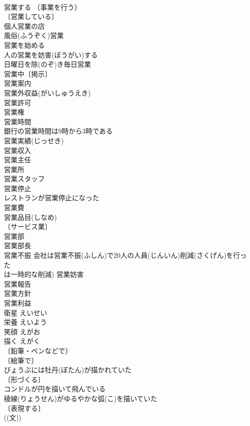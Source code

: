 \documentclass[8pt]{extreport}
\begin{document}
\begin{CJK}{UTF8}{min}
\\	営業する 〔事業を行う〕
\\	〔営業している〕
\\	個人営業の店 
\\	風俗(ふうぞく)営業 
\\	営業を始める 
\\	人の営業を妨害(ぼうがい)する 
\\	日曜日を除(のぞ)き毎日営業 
\\	営業中〔掲示〕 
\\	営業案内 
\\	営業外収益(がいしゅうえき) 
\\	営業許可 
\\	営業権 
\\	営業時間 
\\	銀行の営業時間は9時から3時である 
\\	営業実績(じっせき) 
\\	営業収入 
\\	営業主任 
\\	営業所 
\\	営業スタッフ 
\\	営業停止 
\\	レストランが営業停止になった 
\\	営業費 
\\	営業品目(しなめ) 
\\	〔サービス業〕 
\\	営業部 
\\	営業部長 
\\	営業不振 会社は営業不振(ふしん)で20人の人員(じんいん)削減(さくげん)を行った 
\\	は一時的な削減) 営業妨害 
\\	営業報告 
\\	営業方針 
\\	営業利益 
\\	衛星	えいせい	
\\	栄養	えいよう	
\\	笑顔	えがお	
\\	描く	えがく	
\\	〔鉛筆・ペンなどで〕
\\	〔絵筆で〕
\\	びょうぶには牡丹(ぼたん)が描かれていた 
\\	〔形づくる〕
\\	コンドルが円を描いて飛んでいる 
\\	稜線(りょうせん)がゆるやかな弧(こ)を描いていた 
\\	〔表現する〕
\\	((文)) 

\end{CJK}
\end{document}

